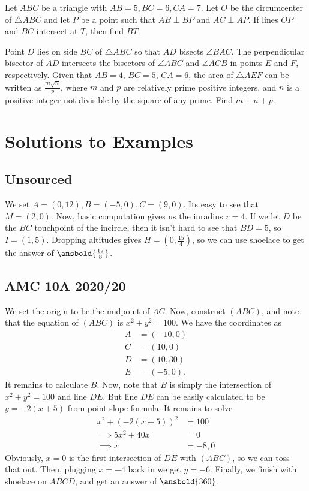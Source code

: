 \documentclass[mast]{lucky}
\begin{document}
\begin{prob}[CIME II 2021/12]{9}
Let $ABC$ be a triangle with $AB = 5, BC = 6, CA = 7$. Let $O$ be the circumcenter of $\triangle ABC$ and let $P$ be a point such that $AB \perp BP$ and $AC \perp AP$. If lines $OP$ and $BC$ intersect at $T$, then find $BT$.
\end{prob}

\begin{prob}[AIME I 2020/13]{9}
Point $D$ lies on side $BC$ of $\triangle ABC$ so that $\overline{AD}$ bisects $\angle BAC$. The perpendicular bisector of $\overline{AD}$ intersects the bisectors of $\angle ABC$ and $\angle ACB$ in points $E$ and $F$, respectively. Given that $AB=4$, $BC=5$, $CA=6$, the area of $\triangle AEF$ can be written as $\tfrac{m\sqrt n}p$, where $m$ and $p$ are relatively prime positive integers, and $n$ is a positive integer not divisible by the square of any prime. Find $m+n+p$.
\end{prob}

\pagebreak

\appendix

\section{Solutions to Examples}
\subsection{Unsourced}
We set $A=(0,12),B=(-5,0),C=(9,0)$. Its easy to see that $M=(2,0)$. Now, basic computation gives us the inradius $r=4$. If we let $D$ be the $BC$ touchpoint of the incircle, then it isn't hard to see that $BD=5$, so $I=(1,5)$. Dropping altitudes gives $H=(0,\frac{15}{4})$, so we can use shoelace to get the answer of $\ansbold{\frac{17}{8}}$.

\subsection{AMC 10A 2020/20}

We set the origin to be the midpoint of $AC$. Now, construct $(ABC)$, and note that the equation of $(ABC)$ is $x^2+y^2=100$. We have the coordinates as
\begin{align*}
    A&=(-10,0)\\
    C&=(10,0)\\
    D&=(10,30)\\
    E&=(-5,0).
\end{align*}
It remains to calculate $B$. Now, note that $B$ is simply the intersection of $x^2+y^2=100$ and line $DE$. But line $DE$ can be easily calculated to be $y=-2(x+5)$ from point slope formula. It remains to solve 
\begin{align*}
    x^2+(-2(x+5))^2&=100\\
    \implies 5x^2+40x&=0\\
    \implies x&=-8,0
\end{align*}
Obviously, $x=0$ is the first intersection of $DE$ with $(ABC)$, so we can toss that out. Then, plugging $x=-4$ back in we get $y=-6$. Finally, we finish with shoelace on $ABCD$, and get an answer of $\ansbold{360}$.
\end{document}
